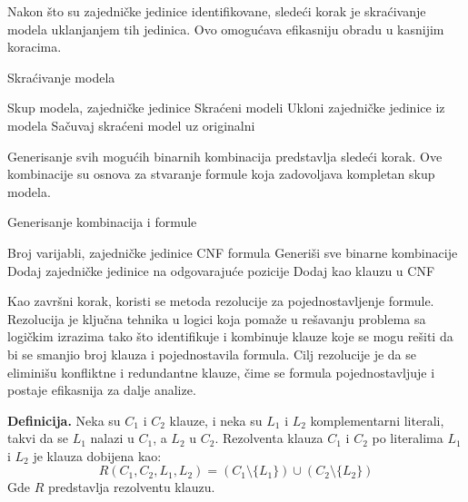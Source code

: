 \documentclass[12pt,oneside]{memoir}
\begin{document}
Nakon što su zajedničke jedinice identifikovane, sledeći korak je skraćivanje modela uklanjanjem tih jedinica. Ovo omogućava efikasniju obradu u kasnijim koracima.\\

\begin{algorithm}
\caption{Skraćivanje modela}
\renewcommand{\algorithmicrequire}{\textbf{Input:}}
\renewcommand{\algorithmicensure}{\textbf{Output:}}
\begin{algorithmic}[1]
\REQUIRE Skup modela, zajedničke jedinice
\ENSURE Skraćeni modeli
    \STATE Ukloni zajedničke jedinice iz modela
    \STATE Sačuvaj skraćeni model uz originalni
\ENDFOR
\end{algorithmic}
\end{algorithm}

Generisanje svih mogućih binarnih kombinacija predstavlja sledeći korak. Ove kombinacije su osnova za stvaranje formule koja zadovoljava kompletan skup modela.\\

\begin{algorithm}
\caption{Generisanje kombinacija i formule}
\renewcommand{\algorithmicrequire}{\textbf{Input:}}
\renewcommand{\algorithmicensure}{\textbf{Output:}}
\begin{algorithmic}[1]
\REQUIRE Broj varijabli, zajedničke jedinice
\ENSURE CNF formula
\STATE Generiši sve binarne kombinacije
    \STATE Dodaj zajedničke jedinice na odgovarajuće pozicije
        \STATE Dodaj kao klauzu u CNF
    \ENDIF
\ENDFOR
\end{algorithmic}
\end{algorithm}

Kao završni korak, koristi se metoda rezolucije za pojednostavljenje formule. Rezolucija je ključna tehnika u logici koja pomaže u rešavanju problema sa logičkim izrazima tako što identifikuje i kombinuje klauze koje se mogu rešiti da bi se smanjio broj klauza i pojednostavila formula. Cilj rezolucije je da se eliminišu konfliktne i redundantne klauze, čime se formula pojednostavljuje i postaje efikasnija za dalje analize.

\textbf{Definicija.} Neka su \( C_1 \) i \( C_2 \) klauze, i neka su \( L_1 \) i \( L_2 \) komplementarni literali, takvi da se \( L_1 \) nalazi u \( C_1 \), a \( L_2 \) u \( C_2 \). Rezolventa klauza \( C_1 \) i \( C_2 \) po literalima \( L_1 \) i \( L_2 \) je klauza dobijena kao:
\[
R(C_1, C_2, L_1, L_2) = \left(C_1 \setminus \{L_1\}\right) \cup \left(C_2 \setminus \{L_2\}\right)
\]
Gde \( R \) predstavlja rezolventu klauzu.\\
\end{document}
